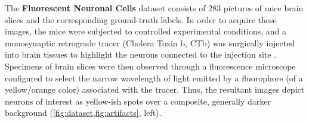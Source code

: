 \clearpage
\restoregeometry


The \textbf{Fluorescent Neuronal Cells} dataset \cite{clissa2021fluocells} consists of 283 
pictures 
of mice brain slices and the corresponding ground-truth labels.
In order to acquire these images, the mice were subjected to controlled experimental conditions, and a monosynaptic retrograde tracer (Cholera Toxin b, CTb) was surgically injected into brain tissues to highlight the neurons connected to the injection site
\cite{hitrec2019neural}.
Specimens of brain slices were then observed through  
a fluorescence microscope configured to select the narrow wavelength of light emitted by 
a fluorophore (of a yellow/orange color) associated with the tracer.
Thus, the resultant images depict neurons of interest as
yellow-ish spots
over a composite, generally darker background (\cref{fig:dataset,fig:artifacts}, left).

